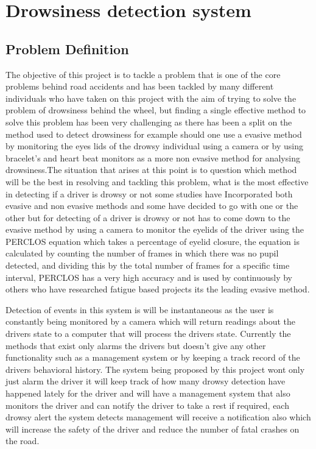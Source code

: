 \chapter{Drowsiness detection system}
\label{chap:problem}

\section{Problem Definition}

The objective of this project is to tackle a problem that is one of the core problems behind road accidents and has been tackled by many different individuals who have taken on this project with the aim of trying to solve the problem of drowsiness behind the wheel, but finding a single effective method to solve this problem has been very challenging as there has been a split on the method used to detect drowsiness for example should one use a  evasive method by monitoring the eyes lids of the drowsy individual using a camera or by using bracelet's and heart beat monitors as a more non evasive method for analysing drowsiness.The situation that arises at this point is to question which method will be the best in resolving and tackling this problem, what is the most effective in detecting if a driver is drowsy or not some studies have Incorporated both evasive and non evasive methods and some have decided to go with one or the other but for detecting of a driver is drowsy or not has to come down to the evasive method by using a camera to monitor the eyelids of the driver using the PERCLOS equation which takes a percentage of eyelid closure, the equation is calculated by counting the number of frames in which there was no pupil detected, and dividing this by the total number of frames for a specific time interval, PERCLOS  has a very high accuracy and is used  by continuously by others who have researched fatigue based projects its the leading evasive method.

Detection of events in this system is will be  instantaneous as the user is constantly being monitored by a camera which will return readings about the drivers state to a computer that will process the drivers state. Currently the methods  that  exist only alarms the drivers but doesn't give any other functionality such as a management system or by keeping a track record of the drivers behavioral history.  The system being proposed by this project wont only just alarm the driver it will keep track of how many drowsy detection have happened lately for the driver  and will have a management system that also monitors the driver and can notify the driver to take a rest if required, each drowsy alert the system detects management will receive a notification also which will increase the safety of the driver and reduce the number of fatal crashes on the road. 




